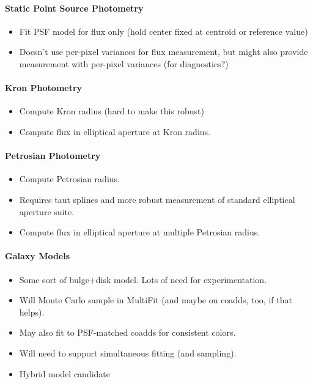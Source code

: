 \paragraph{Static Point Source Photometry}
\label{sec:acStaticPointSourceModels}
\begin{itemize}
\item Fit PSF model for flux only (hold center fixed at centroid or reference value)
\item Doesn't use per-pixel variances for flux measurement, but might also provide measurement with per-pixel variances (for diagnostics?)
\end{itemize}

\paragraph{Kron Photometry}
\label{sec:acKronPhotometry}
\begin{itemize}
\item Compute Kron radius (hard to make this robust)
\item Compute flux in elliptical aperture at Kron radius.
\end{itemize}

\paragraph{Petrosian Photometry}
\label{sec:acPetrosianPhotometry}
\begin{itemize}
\item Compute Petrosian radius.
\item Requires taut splines and more robust measurement of standard elliptical aperture suite.
\item Compute flux in elliptical aperture at multiple Petrosian radius.
\end{itemize}

\paragraph{Galaxy Models}
\label{sec:acGalaxyModels}
\begin{itemize}
\item Some sort of bulge+disk model.  Lots of need for experimentation.
\item Will Monte Carlo sample in MultiFit (and maybe on coadds, too, if that helps).
\item May also fit to PSF-matched coadds for consistent colors.
\item Will need to support simultaneous fitting (and sampling).
\item Hybrid model candidate
\end{itemize}

